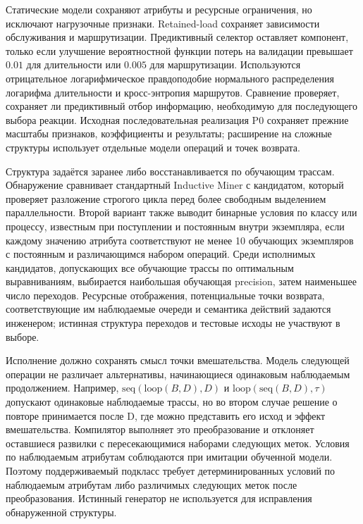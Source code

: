 Статические модели сохраняют атрибуты и ресурсные ограничения, но исключают нагрузочные признаки. Retained-load сохраняет зависимости обслуживания и маршрутизации. Предиктивный селектор оставляет компонент, только если улучшение вероятностной функции потерь на валидации превышает $0.01$ для длительности или $0.005$ для маршрутизации. Используются отрицательное логарифмическое правдоподобие нормального распределения логарифма длительности и кросс-энтропия маршрутов. Сравнение проверяет, сохраняет ли предиктивный отбор информацию, необходимую для последующего выбора реакции. Исходная последовательная реализация P0 сохраняет прежние масштабы признаков, коэффициенты и результаты; расширение на сложные структуры использует отдельные модели операций и точек возврата.

Структура задаётся заранее либо восстанавливается по обучающим трассам. Обнаружение сравнивает стандартный Inductive Miner с кандидатом, который проверяет разложение строгого цикла перед более свободным выделением параллельности. Второй вариант также выводит бинарные условия по классу или процессу, известным при поступлении и постоянным внутри экземпляра, если каждому значению атрибута соответствуют не менее 10 обучающих экземпляров с постоянным и различающимся набором операций. Среди исполнимых кандидатов, допускающих все обучающие трассы по оптимальным выравниваниям, выбирается наибольшая обучающая precision, затем наименьшее число переходов. Ресурсные отображения, потенциальные точки возврата, соответствующие им наблюдаемые очереди и семантика действий задаются инженером; истинная структура переходов и тестовые исходы не участвуют в выборе.

Исполнение должно сохранять смысл точки вмешательства. Модель следующей операции не различает альтернативы, начинающиеся одинаковым наблюдаемым продолжением. Например, $\mathrm{seq}(\mathrm{loop}(B,D),D)$ и $\mathrm{loop}(\mathrm{seq}(B,D),\tau)$ допускают одинаковые наблюдаемые трассы, но во втором случае решение о повторе принимается после D, где можно представить его исход и эффект вмешательства. Компилятор выполняет это преобразование и отклоняет оставшиеся развилки с пересекающимися наборами следующих меток. Условия по наблюдаемым атрибутам соблюдаются при имитации обученной модели. Поэтому поддерживаемый подкласс требует детерминированных условий по наблюдаемым атрибутам либо различимых следующих меток после преобразования. Истинный генератор не используется для исправления обнаруженной структуры.

